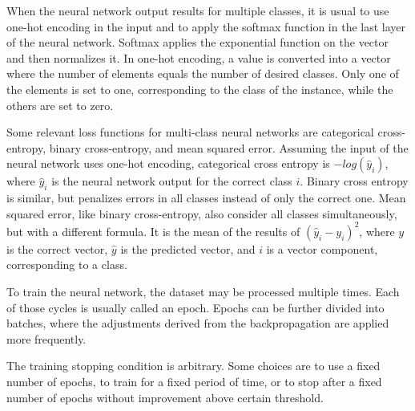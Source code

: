 When the neural network output results for multiple classes, it is usual to use one-hot encoding in the input and to apply the softmax function in the last layer of the neural network. Softmax applies the exponential function on the vector and then normalizes it. In one-hot encoding, a value is converted into a vector where the number of elements equals the number of desired classes. Only one of the elements is set to one, corresponding to the class of the instance, while the others are set to zero.

Some relevant loss functions for multi-class neural networks are categorical cross-entropy, binary cross-entropy, and mean squared error. 
Assuming the input of the neural network uses one-hot encoding, categorical cross entropy is $-log(\hat{y}_i)$, where $\hat{y}_i$ is the neural network output for the correct class $i$. Binary cross entropy is similar, but penalizes errors in all classes instead of only the correct one. Mean squared error, like binary cross-entropy, also consider all classes simultaneously, but with a different formula. It is the mean of the results of $(\hat{y}_i - y_i)^2$, where $y$ is the correct vector, $\hat{y}$ is the predicted vector, and $i$ is a vector component, corresponding to a class.

To train the neural network, the dataset may be processed multiple times. Each of those cycles is usually called an epoch. Epochs can be further divided into batches, where the adjustments derived from the backpropagation are applied more frequently.

The training stopping condition is arbitrary. Some choices are to use a fixed number of epochs, to train for a fixed period of time, or to stop after a fixed number of epochs without improvement above certain threshold.
